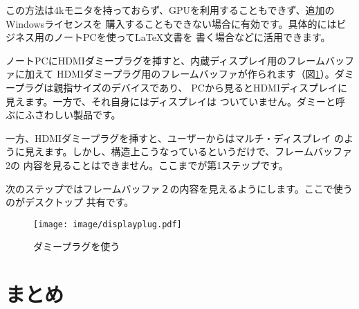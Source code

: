 この方法は4kモニタを持っておらず、GPUを利用することもできず、追加のWindowsライセンスを
購入することもできない場合に有効です。具体的にはビジネス用のノートPCを使って\LaTeX 文書を
書く場合などに活用できます。

ノートPCにHDMIダミープラグを挿すと、内蔵ディスプレイ用のフレームバッファに加えて
HDMIダミープラグ用のフレームバッファが作られます（図\ref{fig:display-plug}）。ダミープラグは親指サイズのデバイスであり、
PCから見るとHDMIディスプレイに見えます。一方で、それ自身にはディスプレイは
ついていません。ダミーと呼ぶにふさわしい製品です。

一方、HDMIダミープラグを挿すと、ユーザーからはマルチ・ディスプレイ
のように見えます。しかし、構造上こうなっているというだけで、フレームバッファ2の
内容を見ることはできません。ここまでが第1ステップです。

次のステップではフレームバッファ２の内容を見えるようにします。ここで使うのがデスクトップ
共有です。


\begin{figure}[btp]
  \begin{center}
    \texttt{[image: image/displayplug.pdf]}
    \caption{ダミープラグを使う} \label{fig:display-plug}
  \end{center}
\end{figure}
\section{まとめ}